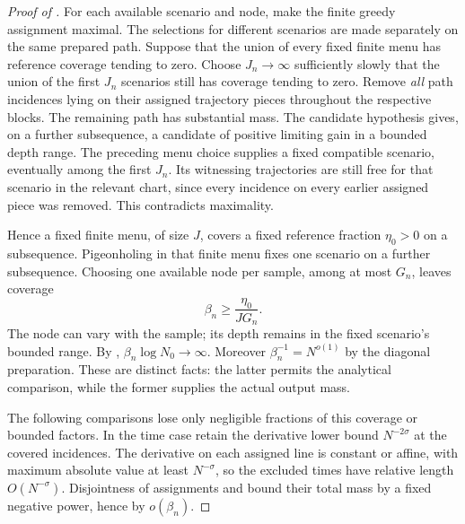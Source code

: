 \begin{proof}[Proof of ]
For each available scenario and node, make the finite greedy assignment
maximal.  The selections for different scenarios are made separately
on the same prepared path.  Suppose that the union of every fixed
finite menu has reference coverage tending to zero.  Choose
\(J_n\to\infty\) sufficiently slowly that the union of the first
\(J_n\) scenarios still has coverage tending to zero.  Remove
\emph{all} path incidences lying on their assigned trajectory pieces
throughout the respective blocks.  The remaining path has substantial
mass.  The candidate hypothesis gives, on a further subsequence,
a candidate of positive limiting gain in a bounded depth range.
The preceding menu choice supplies a fixed compatible scenario,
eventually among the first \(J_n\).  Its witnessing trajectories are
still free for that scenario in the relevant chart, since every
incidence on every earlier assigned piece was removed.  This contradicts
maximality.

Hence a fixed finite menu, of size \(J\), covers a fixed reference
fraction \(\eta_0>0\) on a subsequence.  Pigeonholing in that finite
menu fixes one scenario on a further subsequence.  Choosing one
available node per sample, among at most \(G_n\), leaves coverage
\begin{equation}
\beta_n\ge\frac{\eta_0}{J G_n}.
 \label{a03:covered-fraction}
\end{equation}
The node can vary with the sample; its depth remains in the fixed
scenario's bounded range.  By ,
\(\beta_n\log N_0\to\infty\).  Moreover \(\beta_n^{-1}=N^{o(1)}\)
by the diagonal preparation.  These are distinct facts: the latter
permits the analytical comparison, while the former supplies the
actual output mass.

The following comparisons lose only negligible fractions of this
coverage or bounded factors.  In the time case retain the derivative
lower bound \(N^{-2\sigma}\) at the covered incidences.  The derivative
on each assigned line is constant or affine, with maximum absolute
value at least \(N^{-\sigma}\), so the excluded times have relative
length \(O(N^{-\sigma})\).  Disjointness of assignments and
 bound their total mass by a fixed
negative power, hence by \(o(\beta_n)\).


\end{proof}
